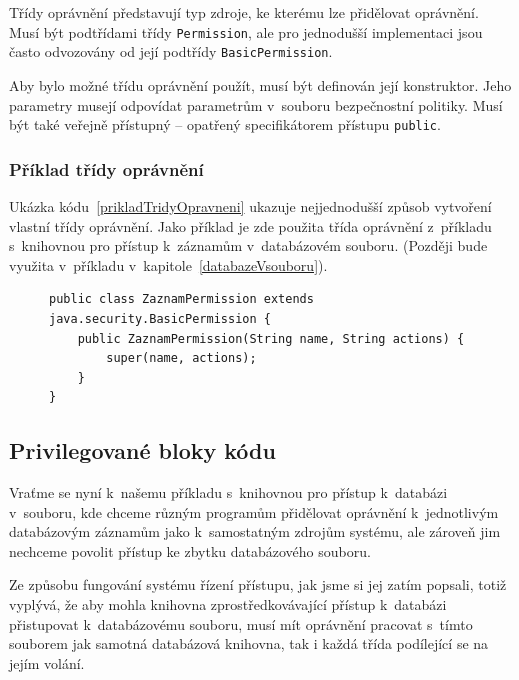 Třídy oprávnění představují typ zdroje, ke kterému lze přidělovat oprávnění. Musí být podtřídami třídy {\tt Permission}, ale pro jednodušší implementaci jsou často odvozovány od její podtřídy {\tt BasicPermission}.

Aby bylo možné třídu oprávnění použít, musí být definován její konstruktor. Jeho parametry musejí odpovídat parametrům v~souboru bezpečnostní politiky. Musí být také veřejně přístupný -- opatřený specifikátorem přístupu {\tt public}.

\subsubsection{Příklad třídy oprávnění} \label{zaznamPerm}

Ukázka kódu~\ref{prikladTridyOpravneni} ukazuje nejjednodušší způsob vytvoření vlastní třídy oprávnění. Jako příklad je zde použita třída oprávnění z~příkladu s~knihovnou pro přístup k~záznamům v~databázovém souboru. (Později bude využita v~příkladu v~kapitole~\ref{databazeVsouboru}).

\begin{figure}[tbh]
\begin{lstlisting}[caption=Demonstrační třída oprávnění, label=prikladTridyOpravneni]
public class ZaznamPermission extends java.security.BasicPermission {
    public ZaznamPermission(String name, String actions) {
        super(name, actions);
    }
}
\end{lstlisting}
\end{figure}

\subsection{Privilegované bloky kódu}\label{privilegovaneBloky}

Vraťme se nyní k~našemu příkladu s~knihovnou pro přístup k~databázi v~souboru, kde chceme různým programům přidělovat oprávnění k~jednotlivým databázovým záznamům jako k~samostatným zdrojům systému, ale zároveň jim nechceme povolit přístup ke zbytku databázového souboru.

Ze způsobu fungování systému řízení přístupu, jak jsme si jej zatím popsali, totiž vyplývá, že aby mohla knihovna zprostředkovávající přístup k~databázi přistupovat k~databázovému souboru, musí mít oprávnění pracovat s~tímto souborem jak samotná databázová knihovna, tak i každá třída podílející se na jejím volání.

